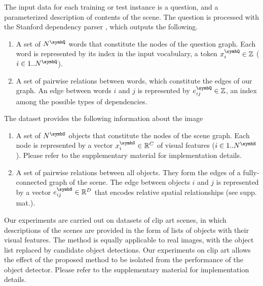 The input data for each training or test instance is a question, and a parameterized description of contents of the scene. The question is processed with the Stanford dependency parser \cite{demarneffe2008parser}, which outputs the following.
\begin{enumerate}[topsep=0pt,itemsep=-1ex,partopsep=1ex,parsep=1.0ex,label={\tiny$\bullet$},leftmargin=2.0ex]
\vspace{1pt}
\item A set of $N^\symbQ$ words that constitute the nodes of the question graph. Each word is represented by its index in the input vocabulary, a token $x_i^\symbQ \in \mathbb{Z}$ ($i\in1..N^\symbQ$).
\vspace{1pt}
\item A set of pairwise relations between words, which constitute the edges of our graph. An edge between words $i$ and $j$ is represented by $e_{ij}^\symbQ \in \mathbb{Z}$, an index among the possible types of dependencies.
\end{enumerate}
\vspace{1pt}
The dataset provides the following information about the image
\begin{enumerate}[topsep=0pt,itemsep=-1ex,partopsep=1ex,parsep=1.0ex,label={\tiny$\bullet$},leftmargin=2.0ex]
\vspace{1pt}
\item A set of $N^\symbS$ objects that constitute the nodes of the scene graph. Each node is represented by a vector $x_i^{\symbS} \in \mathbb{R}^C$ of visual features ($i\in1..N^\symbS$). Please refer to the supplementary material for implementation details.
\vspace{1pt}
\item A set of pairwise relations between all objects. They form the edges of a fully-connected graph of the scene. The edge between objects $i$ and $j$ is represented by a vector $e_{ij}^\symbS \in \mathbb{R}^D$ that encodes relative spatial relationships (see supp. mat.).
\end{enumerate}
\vspace{1pt}
Our experiments are carried out on datasets of clip art scenes, in which descriptions of the scenes are provided in the form of lists of objects with their visual features. The method is equally applicable to real images, with the object list replaced by candidate object detections. Our experiments on clip art allows the effect of the proposed method to be isolated from the performance of the object detector.
Please refer to the supplementary material for implementation details.

